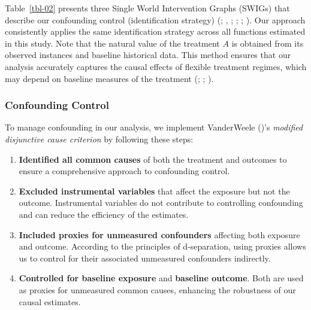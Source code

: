 \documentclass[
  single column]{article}
\providecommand{\tightlist}{%
  \setlength{\itemsep}{0pt}\setlength{\parskip}{0pt}}\usepackage{longtable,booktabs,array}
\begin{document}
Table~\ref{tbl-02} presents three Single World Intervention Graphs
(SWIGs) that describe our confounding control (identification strategy)
(;
,
;
;
;
). Our
approach consistently applies the same identification strategy across
all functions estimated in this study. Note that the natural value of
the treatment \(A\) is obtained from its observed instances and baseline
historical data. This method ensures that our analysis accurately
captures the causal effects of flexible treatment regimes, which may
depend on baseline measures of the treatment
(;
;
).

\subsubsection{Confounding Control}\label{confounding-control}

To manage confounding in our analysis, we implement VanderWeele
()'s \emph{modified disjunctive
cause criterion} by following these steps:

\begin{enumerate}
\def\labelenumi{\arabic{enumi}.}
\tightlist
\item
  \textbf{Identified all common causes} of both the treatment and
  outcomes to ensure a comprehensive approach to confounding control.
\item
  \textbf{Excluded instrumental variables} that affect the exposure but
  not the outcome. Instrumental variables do not contribute to
  controlling confounding and can reduce the efficiency of the
  estimates.
\item
  \textbf{Included proxies for unmeasured confounders} affecting both
  exposure and outcome. According to the principles of d-separation,
  using proxies allows us to control for their associated unmeasured
  confounders indirectly.
\item
  \textbf{Controlled for baseline exposure} and \textbf{baseline
  outcome}. Both are used as proxies for unmeasured common causes,
  enhancing the robustness of our causal estimates.
\end{enumerate}
\end{document}
